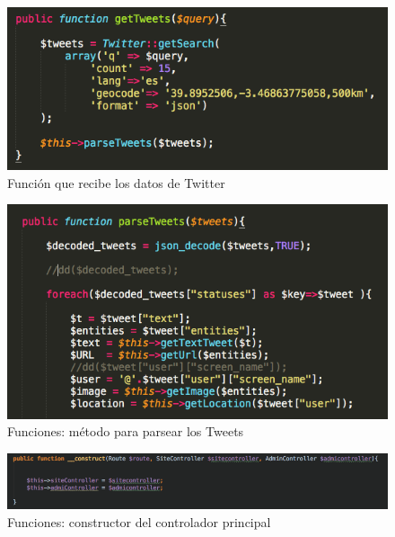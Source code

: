 \begin{figure}
\begin{center}
\includegraphics[width=1.0\textwidth]{imagenes/getTweets.png}
\caption{Función que recibe los datos de Twitter}
\label{getTweets-app}
\end{center}
\end{figure}

\begin{figure}
\begin{center}
\includegraphics[width=1.0\textwidth]{imagenes/parseTweets.png}
\caption{Funciones: método para parsear los Tweets}
\label{parseTweets-app}
\end{center}
\end{figure}

\begin{figure}
\begin{center}
\includegraphics[width=1.0\textwidth]{imagenes/controller-constructor.png}
\caption{Funciones: constructor del controlador principal}
\label{controller-construct}
\end{center}
\end{figure}

